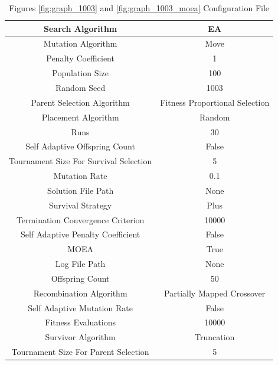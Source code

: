 \documentclass{standalone}
\begin{document}
\begin{table}[!htb]
	\centering
	\caption{Figures \ref{fig:graph_1003} and \ref{fig:graph_1003_moea} Configuration File}
	\label{tab:graph_1003}
	\begin{tabular}{| c | c |}
		\hline
		Search Algorithm		& EA		 \\
		\hline
		Mutation Algorithm		& Move		 \\
		\hline
		Penalty Coefficient		& 1		 \\
		\hline
		Population Size		& 100		 \\
		\hline
		Random Seed		& 1003		 \\
		\hline
		Parent Selection Algorithm		& Fitness Proportional Selection		 \\
		\hline
		Placement Algorithm		& Random		 \\
		\hline
		Runs		& 30		 \\
		\hline
		Self Adaptive Offspring Count		& False		 \\
		\hline
		Tournament Size For Survival Selection		& 5		 \\
		\hline
		Mutation Rate		& 0.1		 \\
		\hline
		Solution File Path		& None		 \\
		\hline
		Survival Strategy		& Plus		 \\
		\hline
		Termination Convergence Criterion		& 10000		 \\
		\hline
		Self Adaptive Penalty Coefficient		& False		 \\
		\hline
		MOEA		& True		 \\
		\hline
		Log File Path		& None		 \\
		\hline
		Offspring Count		& 50		 \\
		\hline
		Recombination Algorithm		& Partially Mapped Crossover		 \\
		\hline
		Self Adaptive Mutation Rate		& False		 \\
		\hline
		Fitness Evaluations		& 10000		 \\
		\hline
		Survivor Algorithm		& Truncation		 \\
		\hline
		Tournament Size For Parent Selection		& 5		 \\
		\hline
	\end{tabular}
\end{table}
\end{document}
